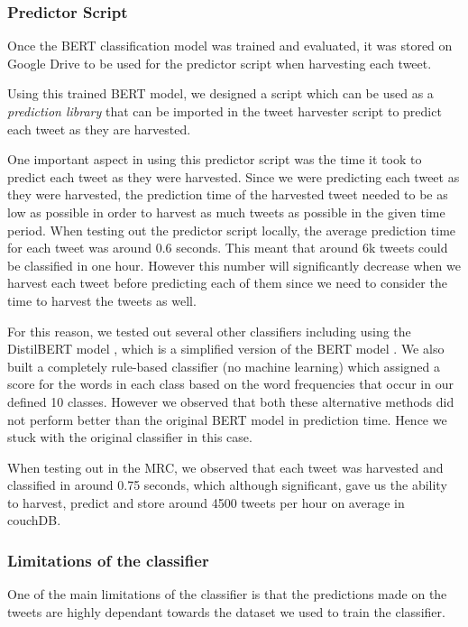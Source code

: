 \documentclass[parskip=full, 11pt]{article}
\begin{document}
\subsubsection{Predictor Script}

Once the BERT classification model was trained and evaluated, it was stored on Google Drive to be used for the predictor script when harvesting each tweet. 

Using this trained BERT model, we designed a script which can be used as a \emph{prediction library} that can be imported in the tweet harvester script to predict each tweet as they are harvested. 

One important aspect in using this predictor script was the time it took to predict each tweet as they were harvested. Since we were predicting each tweet as they were harvested, the prediction time of the harvested tweet needed to be as low as possible in order to harvest as much tweets as possible in the given time period. When testing out the predictor script locally, the average prediction time for each tweet was around 0.6 seconds. This meant that around 6k tweets could be classified in one hour. However this number will significantly decrease when we harvest each tweet before predicting each of them since we need to consider the time to harvest the tweets as well.

For this reason, we tested out several other classifiers including using the DistilBERT model \citep{Sanh2019DistilBERTAD}, which is a simplified version of the BERT model \citep{devlin-etal-2019-bert} . We also built a completely rule-based classifier (no machine learning) which assigned a score for the words in each class based on the word frequencies that occur in our defined 10 classes. However we observed that both these alternative methods did not perform better than the original BERT model in prediction time. Hence we stuck with the original classifier in this case. 

When testing out in the MRC, we observed that each tweet was harvested and classified in around 0.75 seconds, which although significant, gave us the ability to harvest, predict and store around 4500 tweets per hour on average in couchDB. 

\subsubsection{Limitations of the classifier}

One of the main limitations of the classifier is that the predictions made on the tweets are highly dependant towards the dataset we used to train the classifier.
\end{document}
